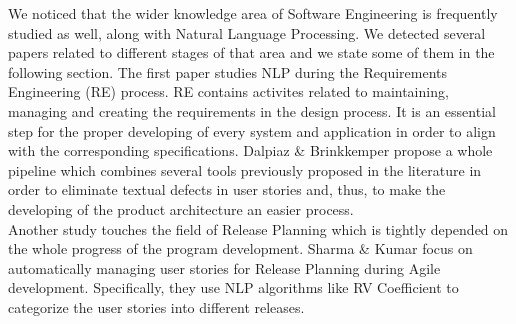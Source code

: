 \begin{table}
\caption{SLRs identified about NLP and Software Testing}
\label{table1}
\end{table}

We noticed that the wider knowledge area of Software Engineering is frequently studied as well, along with Natural Language Processing. We detected several papers related 
to different stages of that area and we state some of them in the following section. The first paper studies NLP during the Requirements Engineering (RE) process. 
RE contains activites related to maintaining, managing and creating the requirements in the design process. It is an essential step for the proper developing of 
every system and application in order to align with the corresponding specifications. Dalpiaz \& Brinkkemper \cite{reqeng1} propose a whole pipeline 
which combines several tools previously proposed in the literature in order to eliminate textual defects in user stories and, thus, to make the developing 
of the product architecture an easier process. \\

Another study touches the field of Release Planning which is tightly depended on the whole progress of the 
program development. Sharma \& Kumar \cite{8701252} focus on automatically managing user stories for Release Planning during Agile development. Specifically, 
they use NLP algorithms like RV Coefficient to categorize the user stories into different releases.\\

